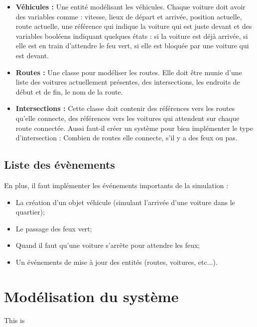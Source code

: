 \documentclass[12pt]{article} %
\begin{document}
\begin{itemize}
\item \textbf{Véhicules :}
Une entité modélisant les véhicules. Chaque voiture doit avoir des variables comme : vitesse, lieux de départ et arrivée, position actuelle, route actuelle, une référence qui indique la voiture qui est juste devant et des variables booléens indiquant quelques états : si la voiture est déjà arrivée, si elle est en train d’attendre le feu vert, si elle est bloquée par une voiture qui est devant. 

\item \textbf{Routes :}
Une classe pour modéliser les routes. Elle doit être munie d’une liste des voitures actuellement présentes, des intersections, les endroits de début et de fin, le nom de la route. 

\item \textbf{Intersections :}
Cette classe doit contenir des références vers les routes qu’elle connecte, des références vers les voitures qui attendent sur chaque route connectée. Aussi faut-il créer un système pour bien implémenter le type d’intersection : Combien de routes elle connecte, s’il y a des feux ou pas. 
\end{itemize}

\subsection{Liste des évènements}
En plus, il faut implémenter les événements importants de la simulation : 

\begin{itemize}
\item La création d'un objet véhicule (simulant l'arrivée d'une voiture dans le quartier); 

\item Le passage des feux vert; 

\item Quand il faut qu'une voiture s'arrête pour attendre les feux; 

\item Un événements de mise à jour des entités (routes, voitures, etc...).
\end{itemize}


\newpage
\section{Modélisation du système}\label{modelisation}
This is
\end{document}
